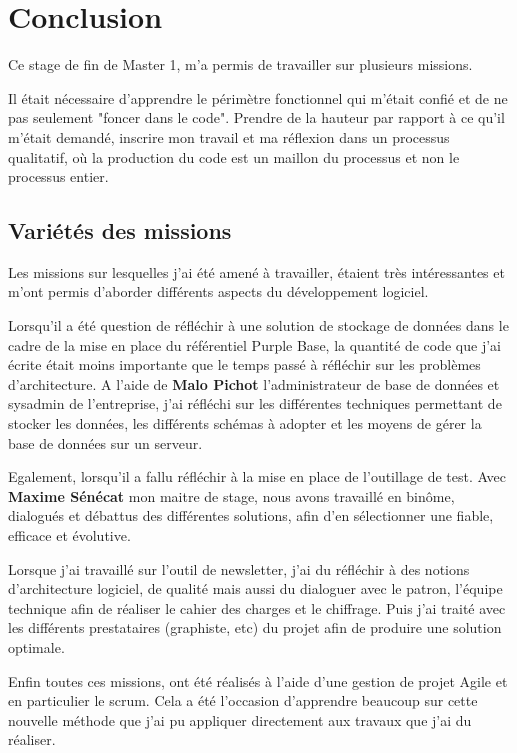 \chapter{Conclusion}


Ce stage de fin de Master 1, m'a permis de travailler sur plusieurs missions.

Il était nécessaire d'apprendre le périmètre fonctionnel qui m'était confié et de ne pas seulement "foncer dans le code".
Prendre de la hauteur par rapport à ce qu'il m'était demandé, inscrire mon travail et ma réflexion dans un processus qualitatif, où la production du code est un maillon du processus et non le processus entier.

\section{Variétés des missions}
Les missions sur lesquelles j'ai été amené à travailler, étaient très intéressantes et m'ont permis d'aborder différents aspects du développement logiciel. 

Lorsqu'il a été question de réfléchir à une solution de stockage de données dans le cadre de la mise en place du référentiel Purple Base, la quantité de code que j'ai écrite était moins importante que le  temps passé à réfléchir sur les problèmes d'architecture.
A l'aide de \textbf{Malo Pichot} l'administrateur de base de données et sysadmin de l'entreprise, 
j'ai réfléchi sur les différentes techniques permettant de stocker les données, les différents schémas à adopter et les moyens de gérer la base de données sur un serveur. %

Egalement, lorsqu'il a fallu réfléchir à la mise en place de l'outillage de test. 
Avec \textbf{Maxime Sénécat} mon maitre de stage, nous avons travaillé en binôme, dialogués et débattus des différentes solutions, afin d'en sélectionner une fiable, efficace et évolutive.  

Lorsque j'ai travaillé sur l'outil de newsletter, j'ai du réfléchir à des notions d'architecture logiciel, de qualité mais aussi du dialoguer avec le patron, l'équipe technique afin de réaliser le cahier des charges et le chiffrage. 
Puis j'ai traité avec les différents prestataires (graphiste, etc) du projet afin de produire une solution optimale.

Enfin toutes ces missions, ont été réalisés à l'aide d'une gestion de projet Agile et en particulier le scrum.
Cela a été l'occasion d'apprendre beaucoup sur cette nouvelle méthode que j'ai pu appliquer directement aux travaux que j'ai du réaliser. 

